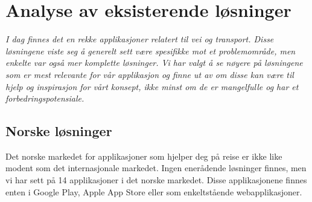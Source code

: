 \documentclass[a4paper,norsk,oneside]{book}
\begin{document}
%
%
%
%
%


\chapter{ Analyse av eksisterende løsninger}\label{T-B}
\label{cha:TheoryAndBackground}

{\it I dag finnes det en rekke applikasjoner relatert til vei og transport. Disse løsningene viste seg å generelt sett være spesifikke mot et problemområde, men enkelte var også mer komplette løsninger. Vi har valgt å se nøyere på løsningene som er mest relevante for vår applikasjon og finne ut av om disse kan være til hjelp og inspirasjon for vårt konsept, ikke minst om de er mangelfulle og har et forbedringspotensiale.}


\section{Norske løsninger}
\label{sec:no1}

Det norske markedet for applikasjoner som hjelper deg på reise er ikke like modent som det internasjonale markedet. Ingen enerådende løsninger finnes, men vi har sett på 14 applikasjoner i det norske markedet. Disse applikasjonene finnes enten i Google Play, Apple App Store eller som enkeltstående webapplikasjoner.
\end{document}
